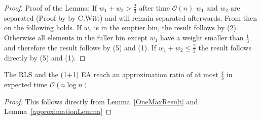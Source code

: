 \begin{proof}
    Proof of the Lemma:\newline
    If \(w_1+w_2 > \frac{2}{3}\) after time $\mathcal{O}(n)$ $w_1$ and $w_2$ are separated (Proof by by C.Witt) and will remain separated afterwards. From then on the following holds. If $w_1$ is in the emptier bin, the result follows by (2). Otherwise all elements in the fuller bin except $w_1$ have a weight smaller than $\frac{1}{3}$ and therefore the result follows by (5) and (1). If \(w_1+w_2 \le \frac{2}{3}\) the result follows directly by (5) and (1).
\end{proof}

\begin{corollary}
    The RLS and the (1+1) EA reach an approximation ratio of at most $\frac{4}{3}$ in expected time $\mathcal{O}(n\log{}n)$
\end{corollary}
\begin{proof}
    This follows directly from Lemma~\ref{OneMaxResult} and Lemma~\ref{approximationLemma}
\end{proof}